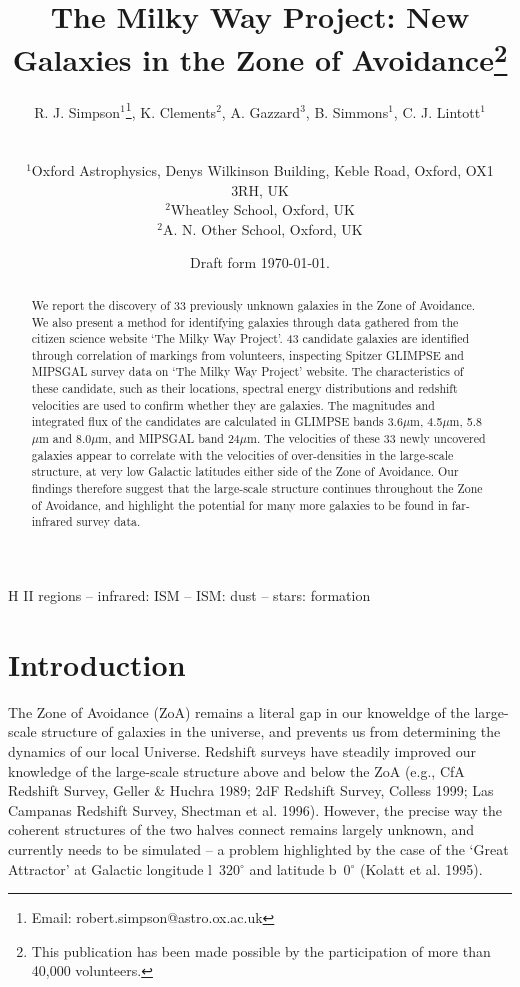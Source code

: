 \documentclass[times,usenatbib]{mn2e}
\title[New Galaxies in the ZoA]{The Milky Way Project: New Galaxies in the Zone of Avoidance\footnote{This publication has been made possible by the participation of more than 40,000 volunteers.}}
\author[Simpson et al.]
{\parbox{\textwidth}{R. J. Simpson$^{1}$\thanks{Email: robert.simpson@astro.ox.ac.uk},
K. Clements$^{2}$,
A. Gazzard$^{3}$,
B. Simmons$^{1}$,
C. J. Lintott$^{1}$}\vspace{0.8cm}\\
\parbox{\textwidth}{
$^{1}$Oxford Astrophysics, Denys Wilkinson Building, Keble Road, Oxford, OX1 3RH, UK \\
$^{2}$Wheatley School, Oxford, UK \\
$^{2}$A. N. Other School, Oxford, UK }}
\date{Draft form \today .}
\begin{document}
\label{firstpage}

\maketitle

\begin{abstract}

We report the discovery of 33 previously unknown galaxies in the Zone of Avoidance. We also present a method for identifying galaxies through data gathered from the citizen science website `The Milky Way Project'. 43 candidate galaxies are identified through correlation of markings from volunteers, inspecting Spitzer GLIMPSE and MIPSGAL survey data on `The Milky Way Project' website. The characteristics of these candidate, such as their locations, spectral energy distributions and redshift velocities are used to confirm whether they are galaxies. The magnitudes and integrated flux of the candidates are calculated in GLIMPSE bands 3.6$\mu$m, 4.5$\mu$m, 5.8$\mu$m and 8.0$\mu$m, and MIPSGAL band 24$\mu$m. The velocities of these 33 newly uncovered galaxies appear to correlate with the velocities of over-densities in the large-scale structure, at very low Galactic latitudes either side of the Zone of Avoidance. Our findings therefore suggest that the large-scale structure continues throughout the Zone of Avoidance, and highlight the potential for many more galaxies to be found in far-infrared survey data.

\end{abstract}
\begin{keywords}
H II regions -- infrared: ISM  -- ISM: dust -- stars: formation
\end{keywords}

\section{Introduction}

The Zone of Avoidance (ZoA) remains a literal gap in our knoweldge of the large-scale structure of galaxies in the universe, and prevents us from determining the dynamics of our local Universe. Redshift surveys have steadily improved our knowledge of the large-scale structure above and below the ZoA (e.g., CfA Redshift Survey, Geller \& Huchra 1989; 2dF Redshift Survey, Colless 1999; Las Campanas Redshift Survey, Shectman et al. 1996). However, the precise way the coherent structures of the two halves connect remains largely unknown, and currently needs to be simulated -- a problem highlighted by the case of the `Great Attractor' at Galactic longitude l~320$^{\circ}$ and latitude b~0$^{\circ}$ (Kolatt et al. 1995).
\end{document}
